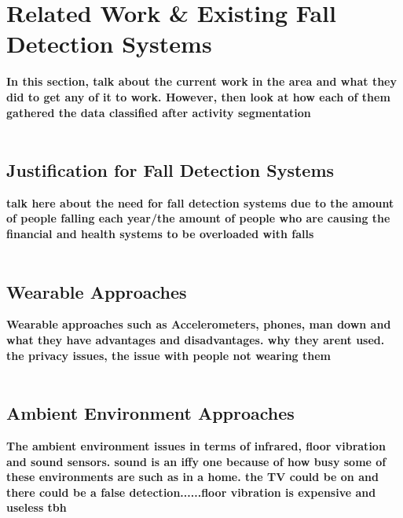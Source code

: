\section{Related Work \& Existing Fall Detection Systems}
\textbf{In this section, talk about the current work in the area and what they did to get any of it to work. However, then look at how each of them gathered the data classified after activity segmentation} \\\\






\subsection{Justification for Fall Detection Systems}
\textbf{talk here about the need for fall detection systems due to the amount of people falling each year/the amount of people who are causing the financial and health systems to be overloaded with falls} \\\\




\subsection{Wearable Approaches}
\textbf{Wearable approaches such as Accelerometers, phones, man down and what they have advantages and disadvantages. why they arent used. the privacy issues, the issue with people not wearing them} \\\\





\subsection{Ambient Environment Approaches} 
\textbf{The ambient environment issues in terms of infrared, floor vibration and sound sensors. sound is an iffy one because of how busy some of these environments are such as in a home. the TV could be on and there could be a false detection......floor vibration is expensive and useless tbh} \\\\




